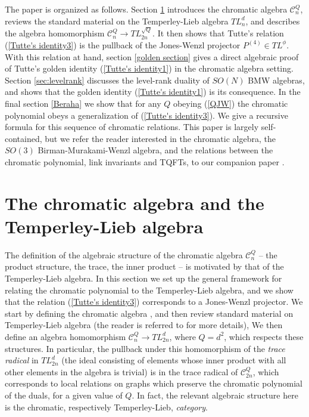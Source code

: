 \documentclass[11pt]{amsart}
\numberwithin{equation}{section}
\theoremstyle{definition}
\begin{document}
The paper is organized as follows.  Section \ref{sec:TL} introduces the
chromatic algebra ${\mathcal C}_n^Q$, reviews the standard material on
the Temperley-Lieb algebra $TL_n^d$, and describes the algebra
homomorphism ${\mathcal C}_n^Q\longrightarrow TL_{2n}^{\sqrt Q}$.  It
then shows that Tutte's relation (\ref{Tutte's identity3}) is the
pullback of the Jones-Wenzl projector $P^{(4)}\in TL^{\phi}$. With this
relation at hand, section \ref{golden section} gives a direct
algebraic proof of Tutte's golden identity (\ref{Tutte's identity1}) in the chromatic
algebra setting. Section \ref{sec:levelrank} discusses the level-rank duality
of $SO(N)$ BMW algebras, and shows that the golden identity (\ref{Tutte's identity1})
is its consequence.
In the final section \ref{Beraha} we show that for any $Q$ obeying
(\ref{QJW}) the chromatic polynomial obeys a generalization of
(\ref{Tutte's identity3}). We give a recursive formula for this
sequence of chromatic relations.  This paper is largely
self-contained, but we refer the reader interested in the
chromatic algebra, the $SO(3)$ Birman-Murakami-Wenzl algebra, and the
relations between the chromatic polynomial, link invariants and TQFTs,
to our companion paper \cite{FK}.





\section{The chromatic algebra and the Temperley-Lieb algebra} \label{sec:TL}

The definition of the algebraic structure of the chromatic algebra
${\mathcal C}^Q_n$ -- the product structure, the trace, the inner
product -- is motivated by that of the Temperley-Lieb algebra.
In this section we set up the general framework for relating the chromatic
polynomial to the Temperley-Lieb algebra, and we show that the relation
(\ref{Tutte's identity3}) corresponds to a Jones-Wenzl projector.
We start by defining the chromatic algebra \cite{Martin,FK}, and then
review standard material on Temperley-Lieb
algebra (the reader is referred to \cite{KL} for more details),
We then define an algebra homomorphism ${\mathcal C}^Q_n\longrightarrow
TL^d_{2n}$, where $Q=d^2$, which respects these structures. In
particular, the pullback under this homomorphism of the {\em trace
radical} in $TL^d_{2n}$ (the ideal consisting of elements whose inner
product with all other elements in the algebra is trivial) is in the
trace radical of ${\mathcal C}^Q_{2n}$, which corresponds to local
relations on graphs which preserve the chromatic polynomial of the
duals, for a given value of $Q$.
In fact, the relevant algebraic
structure here is the chromatic, respectively Temperley-Lieb, {\em
category}.
\end{document}
